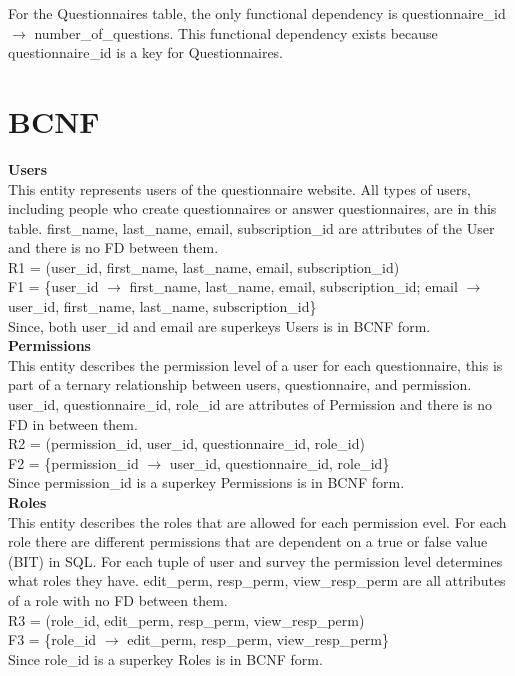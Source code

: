 \documentclass[12pt, oneside, a4paper]{article}
\newcommand{\tb}[1]{\textbf{#1}}
\begin{document}
    For the Questionnaires table, the only functional dependency is questionnaire\_id $\rightarrow$ number\_of\_questions.
    This functional dependency exists because questionnaire\_id is a key for Questionnaires.

    \newpage
    \section{BCNF}
    \tb{Users} \\
    This entity represents users of the questionnaire website.
    All types of users, including people who create questionnaires
    or answer questionnaires, are in this table. first\_name, last\_name, email, subscription\_id are attributes of the User and there is no FD between them. \\
    R1 = (user\_id, first\_name, last\_name, email, subscription\_id) \\
    F1 = \{user\_id \(\rightarrow\) first\_name, last\_name, email, subscription\_id; email \(\rightarrow\) user\_id, first\_name, last\_name, subscription\_id\} \\
    Since, both user\_id and email are superkeys Users is in BCNF form. 
    \\

    \tb{Permissions} \\
    This entity describes the permission level of a user for each 
    questionnaire, this is part of a ternary relationship between users, questionnaire, and permission. user\_id, questionnaire\_id, role\_id are attributes of Permission and there is no FD in between them. \\
    R2 = (permission\_id, user\_id, questionnaire\_id, role\_id) \\
    F2 = \{permission\_id \(\rightarrow\) user\_id, questionnaire\_id, role\_id\} \\
    Since permission\_id is a superkey Permissions is in BCNF form. 
    \\
    
    \tb{Roles} \\
    This entity describes the roles that are allowed for each permission evel. For each role there are different permissions that are dependent on a true or false value (BIT) in SQL. For each tuple of user and survey the permission level determines what roles they have. edit\_perm, resp\_perm, view\_resp\_perm are all attributes of a role with no FD between them. \\
    R3 = (role\_id, edit\_perm, resp\_perm, view\_resp\_perm) \\
    F3 = \{role\_id \(\rightarrow\) edit\_perm, resp\_perm, view\_resp\_perm\} \\
    Since role\_id is a superkey Roles is in BCNF form. 
    \\
\end{document}
